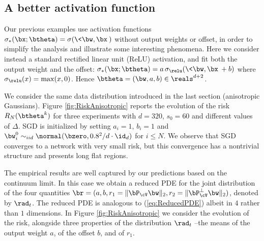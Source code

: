 \documentclass[11pt]{article}
\renewcommand{\eqref}[1]{(\ref{#1})}
\begin{document}
%


\subsection{A better activation function}

Our previous examples use activation functions $\sigma_*(\bx;\btheta) = \sigma(\<\bw,\bx\>)$ without output weights or offset, in
order to simplify the analysis and illustrate some interesting phenomena. Here we consider instead a standard rectified linear unit (ReLU) activation,
and fit both the output weight and the offset:
$\sigma_*(\bx;\btheta)= a\, \sigma_{\relu}(\<\bw,\bx\>+b)$ where $\sigma_{\relu}(x) = \max(x,0)$.
Hence $\btheta= (\bw,a,b)\in\reals^{d+2}$. 

We consider the same data distribution introduced in the last section (anisotropic Gaussians). Figure \ref{fig:RiskAnisotropic}
reports the evolution of the risk $R_{N}(\btheta^k)$ for three experiments with $d=320$, $s_0 =60$ and different values of $\Delta$.
SGD is initialized by setting $a_i=1$, $b_i=1$ and $\bw_i^0 \sim_{iid} \normal(\bzero,0.8^2/d\cdot \id_d)$ for $i \le N$.
We observe that SGD converges to a network with very small risk, but this convergence has a nontrivial structure and presents long flat regions. 

The empirical results are well captured by our predictions based on the continuum limit. In this case
we obtain a reduced PDE for the joint distribution of the four quantities $\br=(a,b,r_1=\|\bP_{\cV}\bw\|_2,r_2=\|\bP^{\perp}_{\cV}\bw\|_2)$,
denoted by $\rad_t$. The reduced PDE is analogous to \eqref{eq:ReducedPDE} albeit in $4$ rather than $1$ dimensions.
In Figure \ref{fig:RiskAnisotropic} we consider the evolution of the risk, alongside  three properties of the distribution $\rad_t$ --the means of the output
weight $a$, of the offset $b$, and of $r_1$. 
\end{document}
